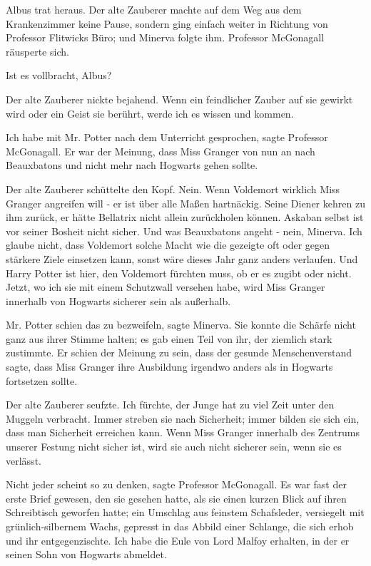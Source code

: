Albus trat heraus. Der alte Zauberer machte auf dem Weg aus dem Krankenzimmer
keine Pause, sondern ging einfach weiter in Richtung von Professor Flitwicks
Büro; und Minerva folgte ihm. Professor McGonagall räusperte sich.

\glqq{}Ist es vollbracht, Albus?\grqq{}

Der alte Zauberer nickte bejahend. \glqq{}Wenn ein feindlicher Zauber auf sie
gewirkt wird oder ein Geist sie berührt, werde ich es wissen und kommen.\grqq{}

\glqq{}Ich habe mit Mr. Potter nach dem Unterricht gesprochen\grqq{}, sagte
Professor McGonagall. \glqq{}Er war der Meinung, dass Miss Granger von nun an
nach Beauxbatons und nicht mehr nach Hogwarts gehen sollte.\grqq{}

Der alte Zauberer schüttelte den Kopf. \glqq{}Nein. Wenn Voldemort wirklich Miss
Granger angreifen will - er ist über alle Maßen hartnäckig. Seine Diener kehren
zu ihm zurück, er hätte Bellatrix nicht allein zurückholen können. Askaban
selbst ist vor seiner Bosheit nicht sicher. Und was Beauxbatons angeht - nein,
Minerva. Ich glaube nicht, dass Voldemort solche Macht wie die gezeigte oft oder
gegen stärkere Ziele einsetzen kann, sonst wäre dieses Jahr ganz anders
verlaufen. Und Harry Potter ist hier, den Voldemort fürchten muss, ob er es
zugibt oder nicht. Jetzt, wo ich sie mit einem Schutzwall versehen habe, wird
Miss Granger innerhalb von Hogwarts sicherer sein als außerhalb.\grqq{}

\glqq{}Mr. Potter schien das zu bezweifeln\grqq{}, sagte Minerva. Sie konnte die
Schärfe nicht ganz aus ihrer Stimme halten; es gab einen Teil von ihr, der
ziemlich stark zustimmte. \glqq{}Er schien der Meinung zu sein, dass der gesunde
Menschenverstand sagte, dass Miss Granger ihre Ausbildung irgendwo anders als in
Hogwarts fortsetzen sollte.\grqq{}

Der alte Zauberer seufzte. \glqq{}Ich fürchte, der Junge hat zu viel Zeit unter
den Muggeln verbracht. Immer streben sie nach Sicherheit; immer bilden sie sich
ein, dass man Sicherheit erreichen kann. Wenn Miss Granger innerhalb des
Zentrums unserer Festung nicht sicher ist, wird sie auch nicht sicherer sein,
wenn sie es verlässt.\grqq{}

\glqq{}Nicht jeder scheint so zu denken\grqq{}, sagte Professor McGonagall. Es
war fast der erste Brief gewesen, den sie gesehen hatte, als sie einen kurzen
Blick auf ihren Schreibtisch geworfen hatte; ein Umschlag aus feinstem
Schafsleder, versiegelt mit grünlich-silbernem Wachs, gepresst in das Abbild
einer Schlange, die sich erhob und ihr entgegenzischte. \glqq{}Ich habe die Eule
von Lord Malfoy erhalten, in der er seinen Sohn von Hogwarts abmeldet.\grqq{}

